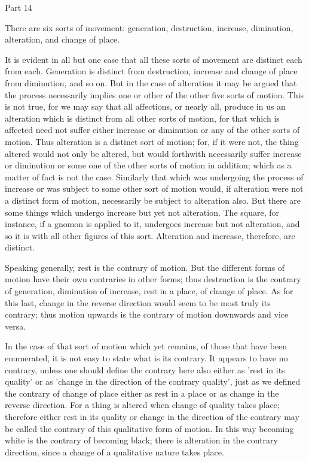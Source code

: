 Part 14

There are six sorts of movement: generation, destruction, increase,
diminution, alteration, and change of place.

It is evident in all but one case that all these sorts of movement are
distinct each from each. Generation is distinct from destruction,
increase and change of place from diminution, and so on. But in the
case of alteration it may be argued that the process necessarily
implies one or other of the other five sorts of motion. This is not
true, for we may say that all affections, or nearly all, produce in us
an alteration which is distinct from all other sorts of motion, for
that which is affected need not suffer either increase or diminution or
any of the other sorts of motion. Thus alteration is a distinct sort of
motion; for, if it were not, the thing altered would not only be
altered, but would forthwith necessarily suffer increase or diminution
or some one of the other sorts of motion in addition; which as a matter
of fact is not the case. Similarly that which was undergoing the
process of increase or was subject to some other sort of motion would,
if alteration were not a distinct form of motion, necessarily be
subject to alteration also. But there are some things which undergo
increase but yet not alteration. The square, for instance, if a gnomon
is applied to it, undergoes increase but not alteration, and so it is
with all other figures of this sort. Alteration and increase,
therefore, are distinct.

Speaking generally, rest is the contrary of motion. But the different
forms of motion have their own contraries in other forms; thus
destruction is the contrary of generation, diminution of increase, rest
in a place, of change of place. As for this last, change in the reverse
direction would seem to be most truly its contrary; thus motion upwards
is the contrary of motion downwards and vice versa.

In the case of that sort of motion which yet remains, of those that
have been enumerated, it is not easy to state what is its contrary. It
appears to have no contrary, unless one should define the contrary here
also either as 'rest in its quality' or as 'change in the direction of
the contrary quality', just as we defined the contrary of change of
place either as rest in a place or as change in the reverse direction.
For a thing is altered when change of quality takes place; therefore
either rest in its quality or change in the direction of the contrary
may be called the contrary of this qualitative form of motion. In this
way becoming white is the contrary of becoming black; there is
alteration in the contrary direction, since a change of a qualitative
nature takes place.



